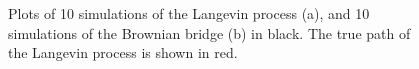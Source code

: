\begin{figure}[H]%
    \centering
    \qquad
    \caption{Plots of 10 simulations of the Langevin process (a), and 10 simulations of the Brownian bridge (b) in black. The true path of the Langevin process is shown in red.}%
    \label{fig:monte carlo paths}%
\end{figure}

\

